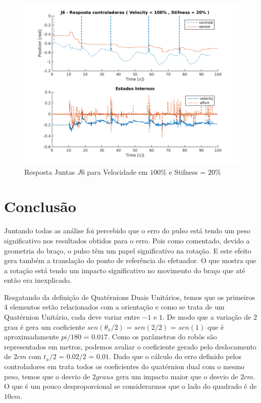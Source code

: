 \vspace{1cm}

\begin{figure}[H]
    \centering
    \includegraphics[width=0.6\linewidth,trim={2cm 1cm 2cm 2cm}]{tex/figs/squareStiffJ7stateEval_J6v100s20.png}
    \caption{Resposta Juntas $J6$ para Velocidade em $100\%$ e Stifness = $20\%$ }
    \label{fig:squareStiffJ7stateEval_J6v100s20}
\end{figure}

\section{Conclusão}

Juntando todas as análise foi percebido que o erro do pulso está tendo um peso significativo nos resultados obtidos para o erro. Pois como comentado, devido a geometria do braço, o pulso têm um papel significativo na rotação. E este efeito gera também a translação do ponto de referência do efetuador. O que mostra que a rotação está tendo um impacto significativo no movimento do braço que até então era inexplicado.

Resgatando da definição de Quatérnions Duais Unitários, temos que os primeiros 4 elementos estão relacionados com a orientação e como se trata de um Quatérnion Unitário, cada deve variar entre $-1$ e $1$. De modo que a variação de 2 grau é gera um coeficiente $sen(\theta_x/2)$ =  $sen(2/2)$ = $sen(1)$ que é aproximadamente $pi/180$ = $0.017$. Como os parâmetros do robôs são representados em metros, podemos avaliar o coeficiente gerado pelo deslocamento de $2cm$ com $t_x/2$ = $0.02/2$ = $0.01$. Dado que o cálculo do erro definido pelos controladores em \cite{marcosps2016} trata todos os coeficientes do quatérnion dual com o mesmo peso, temos que o desvio de $2 graus$ gera um impacto maior que o desvio de $2cm$. O que é um pouco desproporcional se considerarmos que o lado do quadrado é de $10cm$.

